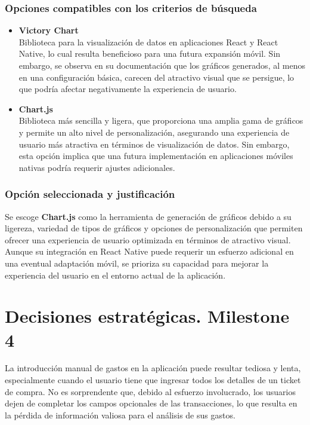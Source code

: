 \subsubsection{Opciones compatibles con los criterios de búsqueda}
\begin{itemize}
    \item \textbf{Victory Chart}\\
    Biblioteca para la visualización de datos en aplicaciones React y React Native, lo cual resulta beneficioso para una futura expansión móvil. Sin embargo, se observa en su documentación que los gráficos generados, al menos en una configuración básica, carecen del atractivo visual que se persigue, lo que podría afectar negativamente la experiencia de usuario.
    
    \item \textbf{Chart.js}\\
    Biblioteca más sencilla y ligera, que proporciona una amplia gama de gráficos y permite un alto nivel de personalización, asegurando una experiencia de usuario más atractiva en términos de visualización de datos. Sin embargo, esta opción implica que una futura implementación en aplicaciones móviles nativas podría requerir ajustes adicionales.
\end{itemize}

\subsubsection{Opción seleccionada y justificación}
Se escoge \textbf{Chart.js} como la herramienta de generación de gráficos debido a su ligereza, variedad de tipos de gráficos y opciones de personalización que permiten ofrecer una experiencia de usuario optimizada en términos de atractivo visual. Aunque su integración en React Native puede requerir un esfuerzo adicional en una eventual adaptación móvil, se prioriza su capacidad para mejorar la experiencia del usuario en el entorno actual de la aplicación\cite{chartjs2023}.


\section{Decisiones estratégicas. Milestone 4}

La introducción manual de gastos en la aplicación puede resultar tediosa y lenta, especialmente cuando el usuario tiene que ingresar todos los detalles de un ticket de compra. No es sorprendente que, debido al esfuerzo involucrado, los usuarios dejen de completar los campos opcionales de las transacciones, lo que resulta en la pérdida de información valiosa para el análisis de sus gastos.

